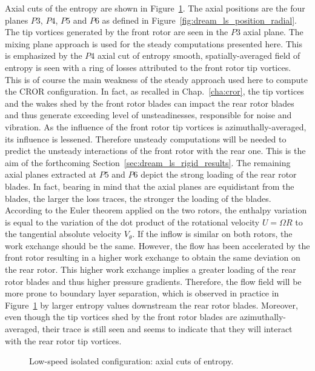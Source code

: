 Axial cuts of the entropy are shown in Figure~\ref{fig:dream_ls_steady_entropy}.
The axial positions are the four planes $P3$, $P4$, $P5$
and $P6$ as defined in Figure~\ref{fig:dream_ls_position_radial}.
The tip vortices generated by the front rotor are seen in the $P3$
axial plane. The mixing plane approach is used for the steady computations
presented here. This is emphasized by the $P4$ axial cut of entropy 
smooth, spatially-averaged field of entropy is seen with a 
ring of losses attributed to the front rotor tip vortices. This is of course the main
weakness of the steady approach used here to compute the CROR configuration.
In fact, as recalled in Chap.~\ref{cha:cror}, the tip vortices and the wakes shed by the
front rotor blades can impact the rear rotor blades and thus generate
exceeding level of unsteadinesses, responsible for noise and vibration. As the influence
of the front rotor tip vortices is azimuthally-averaged, its influence is
lessened. Therefore unsteady computations will be needed to
predict the unsteady interactions of the front rotor with the rear one.
This is the aim of the forthcoming Section~\ref{sec:dream_ls_rigid_results}.
The remaining axial planes extracted at $P5$ and $P6$ depict the strong loading
of the rear rotor blades. In fact, bearing in mind that the
axial planes are equidistant from the blades, the larger the loss traces,
the stronger the loading of the blades. 
According to the Euler theorem applied on the two
rotors, the enthalpy variation is equal to the variation of 
the dot product of the rotational 
velocity $U=\Omega R$ to the tangential absolute velocity
$V_\theta$. If the inflow is similar on both rotors,
the work exchange should be the same. However,
the flow has been accelerated by the front rotor
resulting in a higher work exchange to obtain
the same deviation on the rear rotor.
This higher work exchange implies 
a greater loading of the rear rotor blades and thus
higher pressure gradients. Therefore,
the flow field will be more prone to boundary layer
separation, which is observed in practice in 
Figure~\ref{fig:dream_ls_steady_entropy} by larger entropy
values downstream the rear rotor blades.
Moreover, even though the
tip vortices shed by the front rotor 
blades are azimuthally-averaged,
their trace is still seen and seems to indicate that they will
interact with the rear rotor tip vortices.
\begin{figure}[htp]
  \centering
  \caption{Low-speed isolated configuration: axial cuts of entropy.}
   \label{fig:dream_ls_steady_entropy}
\end{figure}